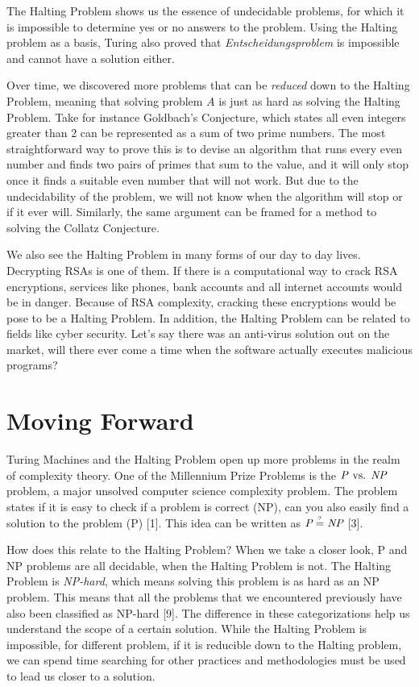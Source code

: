 \documentclass[11pt]{article}
\begin{document}
The Halting Problem shows us the essence of undecidable problems, for which it is impossible to determine yes or no answers to the problem. Using the Halting problem as a basis, Turing also proved that \textit{Entscheidungsproblem} is impossible and cannot have a solution either.

Over time, we discovered more problems that can be \textit{reduced} down to the Halting Problem, meaning that solving problem $A$ is just as hard as solving the Halting Problem. Take for instance Goldbach's Conjecture, which states all even integers greater than 2 can be represented as a sum of two prime numbers. The most straightforward way to prove this is to devise an algorithm that runs every even number and finds two pairs of primes that sum to the value, and it will only stop once it finds a suitable even number that will not work. But due to the undecidability of the problem, we will not know when the algorithm will stop or if it ever will. Similarly, the same argument can be framed for a method to solving the Collatz Conjecture. 

We also see the Halting Problem in many forms of our day to day lives. Decrypting RSAs is one of them. If there is a computational way to crack RSA encryptions, services like phones, bank accounts and all internet accounts would be in danger. Because of RSA complexity, cracking these encryptions would be pose to be a Halting Problem. In addition, the Halting Problem can be related to fields like cyber security. Let's say there was an anti-virus solution out on the market, will there ever come a time when the software actually executes malicious programs? 

\section{Moving Forward}

Turing Machines and the Halting Problem open up more problems in the realm of complexity theory. One of the Millennium Prize Problems is the $\text{\textit{P} vs. \textit{NP}}$ problem, a major unsolved computer science complexity problem. The problem states if it is easy to check if a problem is correct (NP), can you also easily find a solution to the problem (P) [1]. This idea can be written as $\textit{P}\stackrel{\text{\tiny ?}}{=}\textit{NP}$ [3].

How does this relate to the Halting Problem? When we take a closer look, P and NP problems are all decidable, when the Halting Problem is not. The Halting Problem is \textit{NP-hard}, which means solving this problem is as hard as an NP problem. This means that all the problems that we encountered previously have also been classified as NP-hard [9]. The difference in these categorizations help us understand the scope of a certain solution. While the Halting Problem is impossible, for different problem, if it is reducible down to the Halting problem, we can spend time searching for other practices and methodologies must be used to lead us closer to a solution.
\end{document}

